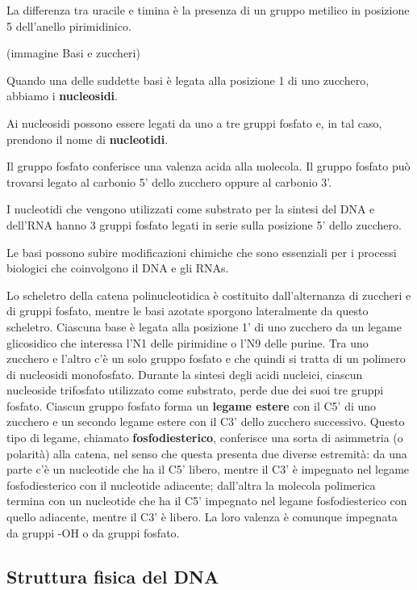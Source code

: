 \documentclass[11pt]{book}
\begin{document}
La differenza tra uracile e timina è la presenza di un gruppo metilico
in posizione 5 dell'anello pirimidinico.

(immagine Basi e zuccheri)

Quando una delle suddette basi è legata alla posizione 1 di uno
zucchero, abbiamo i \textbf{nucleosidi}.

Ai nucleosidi possono essere legati da uno a tre gruppi fosfato e, in
tal caso, prendono il nome di \textbf{nucleotidi}.

Il gruppo fosfato conferisce una valenza acida alla molecola. Il gruppo
fosfato può trovarsi legato al carbonio 5' dello zucchero oppure al
carbonio 3'.

I nucleotidi che vengono utilizzati come substrato per la sintesi del
DNA e dell'RNA hanno 3 gruppi fosfato legati in serie sulla posizione 5'
dello zucchero.

Le basi possono subire modificazioni chimiche che sono essenziali per i
processi biologici che coinvolgono il DNA e gli RNAs.

Lo scheletro della catena polinucleotidica è costituito dall'alternanza
di zuccheri e di gruppi fosfato, mentre le basi azotate sporgono
lateralmente da questo scheletro. Ciascuna base è legata alla posizione
1' di uno zucchero da un legame glicosidico che interessa l'N1 delle
pirimidine o l'N9 delle purine. Tra uno zucchero e l'altro c'è un solo
gruppo fosfato e che quindi si tratta di un polimero di nucleosidi
monofosfato. Durante la sintesi degli acidi nucleici, ciascun nucleoside
trifosfato utilizzato come substrato, perde due dei suoi tre gruppi
fosfato. Ciascun gruppo fosfato forma un \textbf{legame estere} con il
C5' di uno zucchero e un secondo legame estere con il C3' dello zucchero
successivo. Questo tipo di legame, chiamato \textbf{fosfodiesterico},
conferisce una sorta di asimmetria (o polarità) alla catena, nel senso
che questa presenta due diverse estremità: da una parte c'è un
nucleotide che ha il C5' libero, mentre il C3' è impegnato nel legame
fosfodiesterico con il nucleotide adiacente; dall'altra la molecola
polimerica termina con un nucleotide che ha il C5' impegnato nel legame
fosfodiesterico con quello adiacente, mentre il C3' è libero. La loro
valenza è comunque impegnata da gruppi -OH o da gruppi fosfato.

\subsection{Struttura fisica del DNA}\label{struttura-fisica-del-dna}
\end{document}

